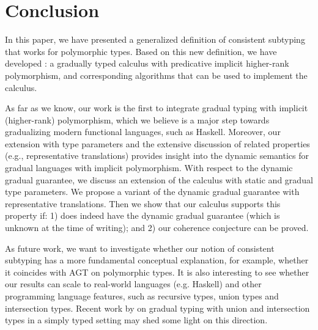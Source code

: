 
\section{Conclusion}
\label{sec:conclusion}

In this paper, we have presented a generalized definition of consistent subtyping
that works for polymorphic types.
Based on this new
definition, we have developed \name: a gradually typed calculus
with predicative implicit higher-rank polymorphism, and corresponding
algorithms that can be used to
implement the calculus.

As far as we know, our work is the first to integrate gradual typing with
implicit (higher-rank) polymorphism, which we believe is a major step
towards gradualizing modern functional languages, such as Haskell. Moreover, our
extension with type parameters and the extensive discussion of related
properties (e.g., representative translations) provides insight into the
dynamic semantics for gradual languages with implicit polymorphism.
With respect to the dynamic gradual guarantee, we discuss an extension
of the calculus with static and gradual type parameters. We propose a
variant of the dynamic gradual guarantee with representative
translations. Then we show that our calculus supports this property
if:
1) \pbc does indeed have the dynamic gradual guarantee (which is unknown at the
time of writing); and 2) our coherence conjecture can be proved.

As future work, we want to investigate whether our notion of consistent
subtyping has a more fundamental conceptual explanation, for example, whether it
coincides with AGT on polymorphic types. It is also interesting to see whether
our results can scale to real-world languages (e.g. Haskell) and other
programming language features, such as recursive types, union types and
intersection types. Recent work by \citet{castagna2017gradual} on gradual typing
with union and intersection types in a simply typed setting may shed some light
on this direction.


